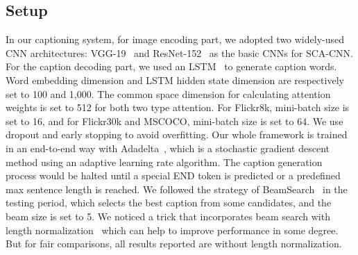 \documentclass[10pt,twocolumn,letterpaper]{article}
\begin{document}
\subsection{Setup}
In our captioning system, for image encoding part, we adopted two widely-used CNN architectures: VGG-19~\cite{simonyan2014very} and
ResNet-152~\cite{he2015deep} as the basic CNNs for SCA-CNN. For the caption decoding part, we used an LSTM~\cite{lstm} to generate caption words. Word
embedding dimension and LSTM hidden state dimension are respectively set to 100 and 1,000. The common space dimension for calculating attention weights is set
to 512 for both two type attention.
For Flickr8k, mini-batch size is set to 16, and for Flickr30k and MSCOCO, mini-batch size is set to 64. We use dropout and early stopping to avoid
overfitting. Our whole framework is trained in an end-to-end way with Adadelta~\cite{adadelta}, which is a stochastic gradient descent method using an
adaptive learning rate algorithm. The caption generation process would be halted until a special END token is predicted or a predefined max sentence length is
reached. We followed the strategy of BeamSearch~\cite{vinyals2015show} in the testing period, which selects the best caption from some candidates, and the
beam size is set to 5. We noticed a trick that incorporates beam search with length normalization~\cite{jia2015guiding} which can help to improve performance
in some degree. But for fair comparisons, all results reported are without length normalization.
\end{document}
